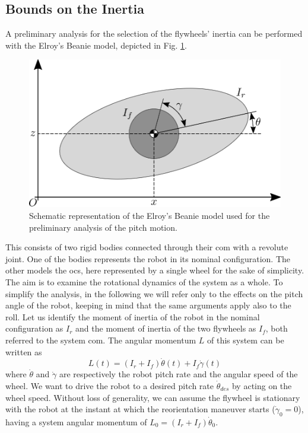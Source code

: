 \documentclass[letterpaper, 10 pt, conference]{ieeeconf}      %
\begin{document}
\subsection{Bounds on the Inertia}
A preliminary analysis for the selection of the flywheels' inertia can be performed with the Elroy's Beanie model, depicted in Fig. \ref{fig:elroy-beanie}.
\begin{figure}
	\centering
	\includegraphics[width=.7\linewidth]{figures/elroys-beanie.eps}
	\caption{\small Schematic representation of the Elroy's Beanie model used for the preliminary analysis of the pitch motion.}
	\label{fig:elroy-beanie}
\end{figure} 
This consists of two rigid bodies connected through their \gls{com} with a revolute joint. One of the bodies represents the robot in its nominal configuration. The other models the \gls{ocs}, here represented by a single wheel for the sake of simplicity. The aim is to examine the rotational dynamics of the system as a whole. To simplify the analysis, in the following we will refer only to the effects on the pitch angle of the robot, keeping in mind that the same arguments apply also to the roll. 
Let us identify the moment of inertia of the robot in the nominal configuration as $I_r$ and the moment of inertia of the two flywheels as $I_f$, both referred to the system \gls{com}.
The angular momentum $L$ of this system can be written as
\begin{equation}\label{eq:ang_mom_elroy}
L(t) = \left(I_r + I_{f}\right)\dot{\theta}(t) + I_{f}\dot{\gamma}(t)
\end{equation}
where $\dot{\theta}$ and $\dot{\gamma}$ are respectively the robot pitch rate and the angular speed of the wheel.
We want to drive the robot to a desired pitch rate $\dot{\theta}_{des}$ by acting on the wheel speed.
Without loss of generality, we can assume the flywheel is stationary with the robot at the instant at which the reorientation maneuver starts ($\dot{\gamma}_0 = 0$), having a system angular momentum of $L_0 = \left(I_r + I_{f}\right)\dot{\theta}_0$.
\end{document}
